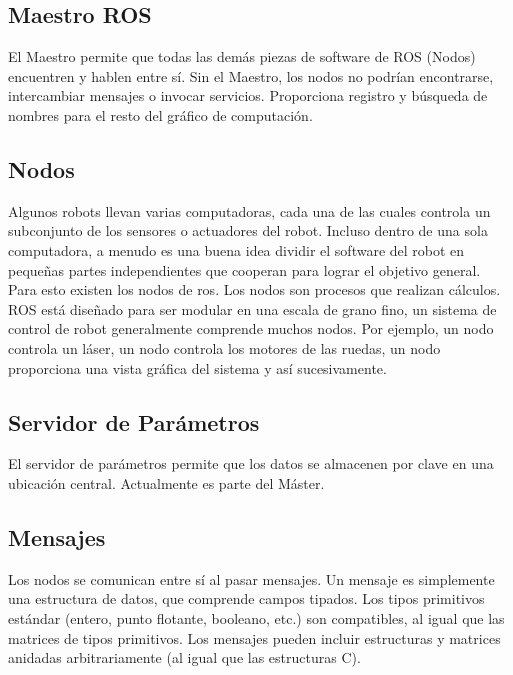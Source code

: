 \subsection{Maestro ROS}
El Maestro permite que todas las demás piezas de software de ROS (Nodos) encuentren y hablen entre sí. Sin el Maestro, los nodos no podrían encontrarse, intercambiar mensajes o invocar servicios. Proporciona registro y búsqueda de nombres para el resto del gráfico de computación.

\subsection{Nodos}
Algunos robots llevan varias computadoras, cada una de las cuales controla un subconjunto de los sensores o actuadores del robot. Incluso dentro de una sola computadora, a menudo es una buena idea dividir el software del robot en pequeñas partes independientes que cooperan para lograr el objetivo general. Para esto existen los nodos de ros.
Los nodos son procesos que realizan cálculos. ROS está diseñado para ser modular en una escala de grano fino, un sistema de control de robot generalmente comprende muchos nodos.
Por ejemplo, un nodo controla un láser, un nodo controla los motores de las ruedas, un nodo proporciona una vista gráfica del sistema y así sucesivamente.

\subsection{Servidor de Parámetros}
El servidor de parámetros permite que los datos se almacenen por clave en una ubicación central. Actualmente es parte del Máster.

\subsection{Mensajes}
Los nodos se comunican entre sí al pasar mensajes. Un mensaje es simplemente una estructura de datos, que comprende campos tipados. Los tipos primitivos estándar (entero, punto flotante, booleano, etc.) son compatibles, al igual que las matrices de tipos primitivos. Los mensajes pueden incluir estructuras y matrices anidadas arbitrariamente (al igual que las estructuras C).

